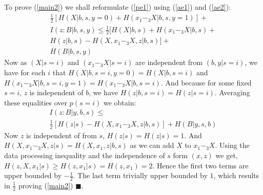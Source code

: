 To prove (\ref{main2}) we shall reformulate (\ref{pe1}) using (\ref{ae1}) and (\ref{ae2}):
\begin{multline}
\frac{1}{2}[H(X|b,s,y=0)+H(x_1-_3X|b,s,y=1)]+\\I(z:B|b,s,y) \leq \frac{1}{2}[H(X|b,s)+H(x_1-_3X|b,s)+\\H(z|b,s)-H(X,x_1-_3X,z|b,s)]+\\H(B|b,s,y)
\end{multline}
Now as $(X|s=i)$  and $(x_1-_3X|s=i)$ are independent from $(b,y|s=i)$, we have for each $i$ that $H(X|b,s=i,y=0)=H(X|b,s=i)$ and $H(x_1-_3X|b,s=i,y=1)=H(x_1-_3X|b,s=i)$. And because for some fixed $s=i$, $z$ is independent of $b$, we have $H(z|b,s=i)=H(z|s=i)$. Averaging these equalities over $p(s=i)$ we obtain:
\begin{multline}
I(z:B|y,b,s) \leq \\ \frac{1}{2}[H(z|s)-H(X,x_1-_3X,z|b,s)]+H(B|y,s,b)
\end{multline}
Now $z$ is independent of from $s$, $H(z|s)=H(z|s)=1$. And $H(X,x_1-_3X,z|s)=H(X,x_1,z|b,s)$ as we can add $X$ to $x_1-_3X$. Using the data processing inequality and the independence of $s$ form $(x,z)$ we get, $H(z,X,x_1|s)\geq H(z,x_1|s)=H(z,x_1)=2$. Hence the first two terms are upper bounded by $-\frac{1}{2}$. The last term trivially upper bounded by $1$, which results in $\frac{1}{2}$ proving (\ref{main2}) $\blacksquare$.
